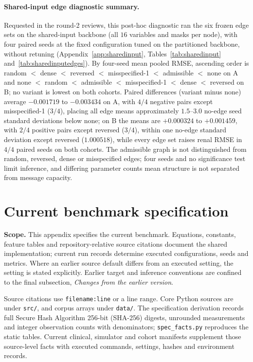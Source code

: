 \paragraph{Shared-input edge diagnostic summary.}\label{app:sharedinputedgesummary}
Requested in the round-2 reviews, this post-hoc diagnostic ran the six frozen edge sets on the shared-input backbone (all $16$ variables and masks per node), with four paired seeds at the fixed configuration tuned on the partitioned backbone, without retuning (Appendix~\ref{app:sharedinput}, Tables~\ref{tab:sharedinput} and~\ref{tab:sharedinputedges}). By four-seed mean pooled RMSE, ascending order is random $<$ dense $<$ reversed $<$ misspecified-1 $<$ admissible $<$ none on A and none $<$ random $<$ admissible $<$ misspecified-1 $<$ dense $<$ reversed on B; no variant is lowest on both cohorts. Paired differences (variant minus none) average $-0.001719$ to $-0.003434$ on A, with $4/4$ negative pairs except misspecified-1 ($3/4$), placing all edge means approximately $1.5$--$3.0$ no-edge seed standard deviations below none; on B the means are $+0.000324$ to $+0.001459$, with $2/4$ positive pairs except reversed ($3/4$), within one no-edge standard deviation except reversed ($1.000518$), while every edge set raises renal RMSE in $4/4$ paired seeds on both cohorts. The admissible graph is not distinguished from random, reversed, dense or misspecified edges; four seeds and no significance test limit inference, and differing parameter counts mean structure is not separated from message capacity.



\clearpage
\section{Current benchmark specification}\label{app:spec}
\noindent\textbf{Scope.} This appendix specifies the current benchmark. Equations, constants, feature tables and repository-relative source citations document the shared implementation; current run records determine executed configurations, seeds and metrics. Where an earlier source default differs from an executed setting, the setting is stated explicitly. Earlier target and inference conventions are confined to the final subsection, \emph{Changes from the earlier version}.

\medskip


Source citations use \texttt{filename:line} or a line range. Core Python sources are under \texttt{src/}, and corpus arrays under \texttt{data/}. The specification derivation records full Secure Hash Algorithm 256-bit (SHA-256) digests, unrounded measurements and integer observation counts with denominators; \texttt{spec\_facts.py} reproduces the static tables. Current clinical, simulator and cohort manifests supplement those source-level facts with executed commands, settings, hashes and environment records.

